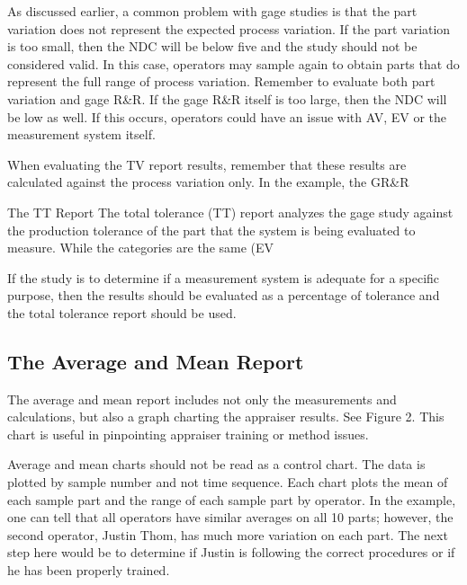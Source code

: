 As discussed earlier, a common problem with gage studies is that the part variation does not represent the expected process variation. If the part variation is too small, then the NDC will be below five and the study should not be considered valid. In this case, operators may sample again to obtain parts that do represent the full range of process variation. Remember to evaluate both part variation and gage R&R. If the gage R&R itself is too large, then the NDC will be low as well. If this occurs, operators could have an issue with AV, EV or the measurement system itself.

When evaluating the TV report results, remember that these results are calculated against the process variation only. In the example, the GR&R%

The TT Report
The total tolerance (TT) report analyzes the gage study against the production tolerance of the part that the system is being evaluated to measure. While the categories are the same (EV%

If the study is to determine if a measurement system is adequate for a specific purpose, then the results should be evaluated as a percentage of tolerance and the total tolerance report should be used.


\subsection*{The Average and Mean Report}
The average and mean report includes not only the measurements and calculations, but also a graph charting the appraiser results. See Figure 2. This chart is useful in pinpointing appraiser training or method issues. 

Average and mean charts should not be read as a control chart. The data is plotted by sample number and not time sequence. Each chart plots the mean of each sample part and the range of each sample part by operator. In the example, one can tell that all operators have similar averages on all 10 parts; however, the second operator, Justin Thom, has much more variation on each part. The next step here would be to determine if Justin is following the correct procedures or if he has been properly trained.

